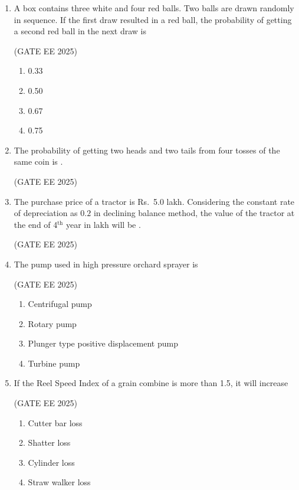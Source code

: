 \documentclass[journal,12pt,onecolumn]{IEEEtran}
\theoremstyle{remark}
\begin{document}
\begin{enumerate}
\item A box contains three white and four red balls. Two balls are drawn randomly in sequence. If the first draw resulted in a red ball, the probability of getting a second red ball in the next draw is

\hfill(GATE EE 2025)

\begin{multicols}{4}
\begin{enumerate}
\item 0.33
\item 0.50
\item 0.67
\item 0.75
\end{enumerate}
\end{multicols} 

\item The probability of getting two heads and two tails from four tosses of the same coin is \underline{\hspace{2cm}}.

\hfill(GATE EE 2025)

\item The purchase price of a tractor is Rs.\ 5.0 lakh. Considering the constant rate of depreciation as $0.2$ in declining balance method, the value of the tractor at the end of 4$^{\text{th}}$ year in lakh will be \underline{\hspace{2cm}}.

\hfill(GATE EE 2025)

\item The pump used in high pressure orchard sprayer is

\hfill(GATE EE 2025)

\begin{multicols}{2} 
\begin{enumerate}
\item Centrifugal pump
\item Rotary pump
\item Plunger type positive displacement pump
\item Turbine pump
\end{enumerate}
\end{multicols}
\newpage
\item If the Reel Speed Index of a grain combine is more than 1.5, it will increase

\hfill(GATE EE 2025)

\begin{multicols}{2}
\begin{enumerate}
\item Cutter bar loss
\item Shatter loss
\item Cylinder loss
\item Straw walker loss
\end{enumerate}
\end{multicols}


\end{enumerate}
\end{document}
